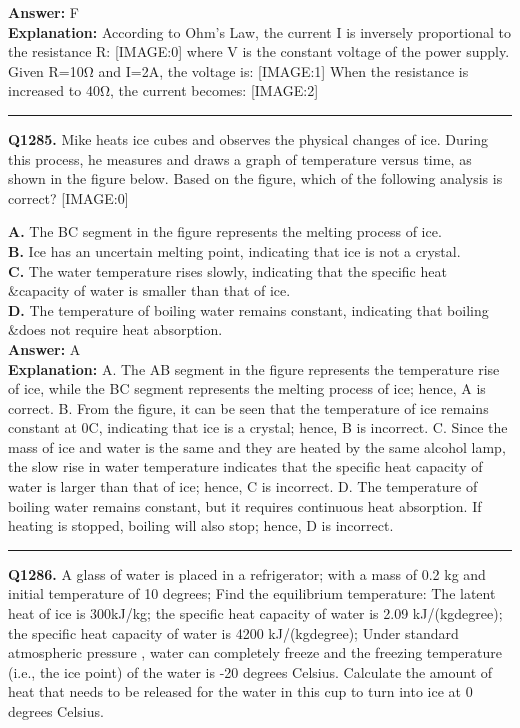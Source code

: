 \documentclass[12pt]{article}
\begin{document}
\textbf{Answer:} F \\
\textbf{Explanation:} According to Ohm's Law, the current I is inversely proportional to the resistance R:
[IMAGE:0]
where V is the constant voltage of the power supply. Given R=10Ω and I=2A, the voltage is:
[IMAGE:1]
When the resistance is increased to 40Ω, the current becomes:
[IMAGE:2]

\hrule
\vspace{1em}


\noindent
\textbf{Q1285.} Mike heats ice cubes and observes the physical changes of ice. During this process, he measures and draws a graph of temperature versus time, as shown in the figure below. Based on the figure, which of the following analysis is correct?
[IMAGE:0]



\textbf{A.} The BC segment in the figure represents the melting process of ice. \\
\textbf{B.} Ice has an uncertain melting point, indicating that ice is not a crystal. \\
\textbf{C.} The water temperature rises slowly, indicating that the specific heat &capacity of water is smaller than that of ice. \\
\textbf{D.} The temperature of boiling water remains constant, indicating that boiling &does not require heat absorption. \\

\textbf{Answer:} A \\
\textbf{Explanation:} A. The AB segment in the figure represents the temperature rise of ice, while the BC segment represents the melting process of ice; hence, A is correct.
B. From the figure, it can be seen that the temperature of ice remains constant at 0\circ C, indicating that ice is a crystal; hence, B is incorrect.
C. Since the mass of ice and water is the same and they are heated by the same alcohol lamp, the slow rise in water temperature indicates that the specific heat capacity of water is larger than that of ice; hence, C is incorrect.
D. The temperature of boiling water remains constant, but it requires continuous heat absorption. If heating is stopped, boiling will also stop; hence, D is incorrect.

\hrule
\vspace{1em}


\noindent
\textbf{Q1286.} A glass of water is placed in a refrigerator; with a mass of 0.2 kg and initial temperature of 10 degrees; Find the equilibrium temperature: The latent heat of ice is 300kJ/kg; the specific heat capacity of water is 2.09 kJ/(kg\cdot degree); the specific heat capacity of water is 4200 kJ/(kg\cdot degree); Under standard atmospheric pressure , water can completely freeze and the freezing temperature (i.e., the ice point) of the water is -20 degrees Celsius.
Calculate the amount of heat that needs to be released for the water in this cup to turn into ice at 0 degrees Celsius.
\end{document}
